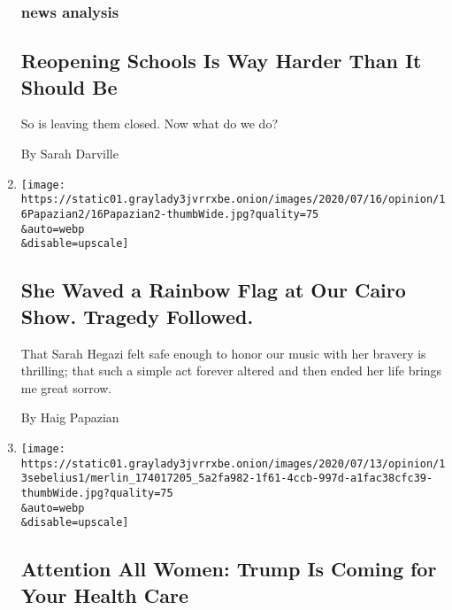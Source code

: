 \begin{enumerate}
  \hypertarget{news-analysis}{%
  \subsubsection{news analysis}\label{news-analysis}}

  \hypertarget{reopening-schools-is-way-harder-than-it-should-be}{%
  \subsection{Reopening Schools Is Way Harder Than It Should
  Be}\label{reopening-schools-is-way-harder-than-it-should-be}}

  So is leaving them closed. Now what do we do?

  By Sarah Darville
\item
  \href{/2020/07/16/opinion/culture/mashrou-leila-fan-suicide.html}{}

  \texttt{[image: https://static01.graylady3jvrrxbe.onion/images/2020/07/16/opinion/16Papazian2/16Papazian2-thumbWide.jpg?quality=75\\\&auto=webp\\\&disable=upscale]}

  \hypertarget{she-waved-a-rainbow-flag-at-our-cairo-show-tragedy-followed}{%
  \subsection{She Waved a Rainbow Flag at Our Cairo Show. Tragedy
  Followed.}\label{she-waved-a-rainbow-flag-at-our-cairo-show-tragedy-followed}}

  That Sarah Hegazi felt safe enough to honor our music with her bravery
  is thrilling; that such a simple act forever altered and then ended
  her life brings me great sorrow.

  By Haig Papazian
\item
  \href{/2020/07/13/opinion/obamacare-aca-trump-women.html}{}

  \texttt{[image: https://static01.graylady3jvrrxbe.onion/images/2020/07/13/opinion/13sebelius1/merlin\_174017205\_5a2fa982-1f61-4ccb-997d-a1fac38cfc39-thumbWide.jpg?quality=75\\\&auto=webp\\\&disable=upscale]}

  \hypertarget{attention-all-women-trump-is-coming-for-your-health-care}{%
  \subsection{Attention All Women: Trump Is Coming for Your Health
  Care}\label{attention-all-women-trump-is-coming-for-your-health-care}}


\end{enumerate}
